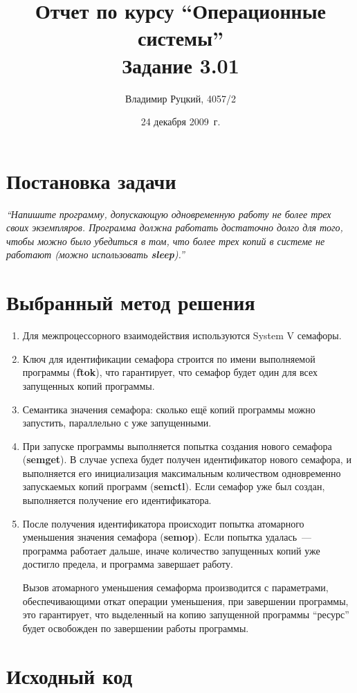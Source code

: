 \documentclass[a4paper,12pt]{article}
\title{Отчет по курсу ``Операционные системы'' \\ Задание 3.01}
\author{Владимир Руцкий, 4057/2}
\date{24 декабря 2009~г.}
\newcommand{\commandquote}[1]{\textbf{#1}}
\begin{document}
\maketitle

\section*{Постановка задачи}
\textit{``Напишите программу, допускающую одновременную работу не более трех
своих экземпляров. Программа должна работать достаточно долго для того,
чтобы можно было убедиться в том, что более трех копий в системе не
работают (можно использовать \commandquote{sleep}).''}

\section*{Выбранный метод решения}
\begin{enumerate}
 \item[] Для межпроцессорного взаимодействия используются System V семафоры.
 \item[] Ключ для идентификации семафора строится по имени выполняемой программы 
(\commandquote{ftok}), что гарантирует, что семафор будет один для всех запущенных копий программы.
 \item[] Семантика значения семафора: сколько ещё копий программы можно запустить, 
параллельно с уже запущенными.
 \item При запуске программы выполняется попытка создания нового семафора (\commandquote{semget}). 
В случае успеха будет получен идентификатор нового семафора, и выполняется
его инициализация максимальным количеством одновременно запускаемых копий программ 
(\commandquote{semctl}).
Если семафор уже был создан, выполняется получение его идентификатора. 
 \item После получения идентификатора происходит попытка атомарного уменьшения значения семафора 
(\commandquote{semop}). Если попытка удалась~--- программа работает дальше, 
иначе количество запущенных копий уже достигло предела, и программа завершает работу.

Вызов атомарного уменьшения семаформа производится с параметрами, обеспечивающими откат операции уменьшения, 
при завершении программы, это гарантирует, что выделенный на копию запущенной программы ``ресурс'' будет
освобожден по завершении работы программы.
\end{enumerate}

\section*{Исходный код}
\lstset{language=bash, caption=task\_3\_01.c,%
label=source-code, basicstyle=\footnotesize,%
numbers=left, numberstyle=\footnotesize, numbersep=5pt, frame=single, breaklines=true, breakatwhitespace=false,%
inputencoding=utf8x}

\end{document}
